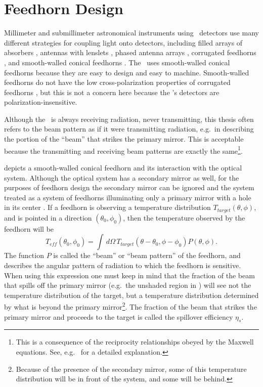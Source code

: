 
\section{Feedhorn Design}\label{sec:ch4-feedhorn-design}

Millimeter and submillimeter astronomical instruments using \TES\ detectors use many different strategies for coupling light onto detectors, including filled arrays of absorbers \cite{swetz_overview_2011,holland_scuba-2:_2013}, antennas with lenslets \cite{keating_ultra_2011}, phased antenna arrays \cite{obrient_antenna-coupled_2012}, corrugated feedhorns \cite{austermann_sptpol:_2012,niemack_actpol:_2010}, and smooth-walled conical feedhorns \cite{schwan_invited_2011,carlstrom_10_2011}.
The \Imager\ uses smooth-walled conical feedhorns because they are easy to design and easy to machine.
Smooth-walled feedhorns do not have the low cross-polarization properties of corrugated feedhorns \cite{clarricoats_corrugated_1984}, but this is not a concern here because the \Imager's detectors are polarization-insensitive.

Although the \Imager\ is always receiving radiation, never transmitting, this thesis often refers to the beam pattern as if it were transmitting radiation, e.g.\ in describing the portion of the ``beam'' that strikes the primary mirror.
This is acceptable because the transmitting and receiving beam patterns are exactly the same\footnote{This is a consequence of the reciprocity relationships obeyed by the Maxwell equations. See, e.g.\ \cite{balanis_antenna_2005} for a detailed explanation.}.

 depicts a smooth-walled conical feedhorn and its interaction with the optical system.
Although the optical system has a secondary mirror as well, for the purposes of feedhorn design the secondary mirror can be ignored and the system treated as a system of feedhorns illuminating only a primary mirror with a hole in its center \cite{goldsmith_quasioptical_1998}.
If a feedhorn is observing a temperature distribution $T_{target}(\theta,\phi)$, and is pointed in a direction $(\theta_0, \phi_0)$, then the temperature observed by the feedhorn will be
\begin{equation}
    T_{eff}(\theta_0,\phi_0) = \int \, d \Omega \, T_{target}(\theta - \theta_0,\phi - \phi_0) P(\theta,\phi).
\end{equation}
The function $P$ is called the ``beam'' or ``beam pattern'' of the feedhorn, and describes the angular pattern of radiation to which the feedhorn is sensitive.
When using this expression one must keep in mind that the fraction of the beam that spills off the primary mirror (e.g.\ the unshaded region in ) will see not the temperature distribution of the target, but a temperature distribution determined by what is beyond the primary mirror\footnote{Because of the presence of the secondary mirror, some of this temperature distribution will be in front of the system, and some will be behind.}.
The fraction of the beam that strikes the primary mirror and proceeds to the target is called the spillover efficiency $\eta_s$.

